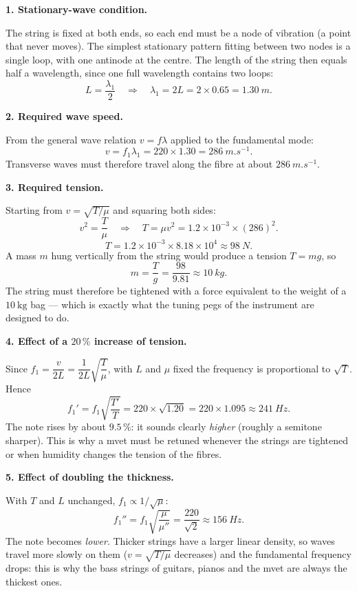 \documentclass[11pt]{article}
\newcommand{\cle}[1]{{\popxbold\color{popdark}#1}}
\begin{document}
\textbf{1. Stationary-wave condition.}\par
The string is fixed at both ends, so each end must be a \cle{node} of vibration (a point that never moves). The simplest stationary pattern fitting between two nodes is a single loop, with one \cle{antinode} at the centre. The length of the string then equals half a wavelength, since one full wavelength contains two loops:
\[ L=\frac{\lambda_1}{2}\quad\Longrightarrow\quad \lambda_1=2L=2\times 0.65=\SI{1.30}{m}. \]

\textbf{2. Required wave speed.}\par
From the general wave relation $v=f\lambda$ applied to the fundamental mode:
\[ v=f_1\lambda_1=220\times 1.30=\SI{286}{m.s^{-1}}. \]
Transverse waves must therefore travel along the fibre at about $\SI{286}{m.s^{-1}}$.

\textbf{3. Required tension.}\par
Starting from $v=\sqrt{T/\mu}$ and squaring both sides:
\[ v^{2}=\frac{T}{\mu}\quad\Longrightarrow\quad T=\mu v^{2}=1.2\times 10^{-3}\times(286)^{2}. \]
\[ T=1.2\times 10^{-3}\times 8.18\times 10^{4}\approx \SI{98}{N}. \]
A mass $m$ hung vertically from the string would produce a tension $T=mg$, so
\[ m=\frac{T}{g}=\frac{98}{9.81}\approx \SI{10}{kg}. \]
The string must therefore be tightened with a force equivalent to the weight of a $10\ \mathrm{kg}$ bag — which is exactly what the tuning pegs of the instrument are designed to do.

\textbf{4. Effect of a $20\,\%$ increase of tension.}\par
Since $f_1=\dfrac{v}{2L}=\dfrac{1}{2L}\sqrt{\dfrac{T}{\mu}}$, with $L$ and $\mu$ fixed the frequency is proportional to $\sqrt{T}$. Hence
\[ f_1'=f_1\sqrt{\frac{T'}{T}}=220\times\sqrt{1.20}=220\times 1.095\approx \SI{241}{Hz}. \]
The note rises by about $9.5\,\%$: it sounds clearly \emph{higher} (roughly a semitone sharper). This is why a mvet must be retuned whenever the strings are tightened or when humidity changes the tension of the fibres.

\textbf{5. Effect of doubling the thickness.}\par
With $T$ and $L$ unchanged, $f_1\propto 1/\sqrt{\mu}$:
\[ f_1''=f_1\sqrt{\frac{\mu}{\mu''}}=\frac{220}{\sqrt{2}}\approx \SI{156}{Hz}. \]
The note becomes \emph{lower}. Thicker strings have a larger linear density, so waves travel more slowly on them ($v=\sqrt{T/\mu}$ decreases) and the fundamental frequency drops: this is why the bass strings of guitars, pianos and the mvet are always the thickest ones.
\end{document}
